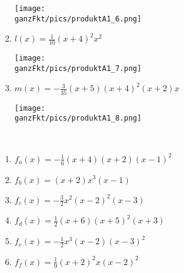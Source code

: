 \begin{Answer}[ref=ganzProduktA1]
\begin{minipage}{\textwidth}
\begin{minipage}{0.49\textwidth}
\begin{enumerate}[label=\alph*)]
\begin{minipage}[t]{0.95\textwidth}
					\texttt{[image: \\ganzFkt/pics/produktA1\_6.png]}
				\end{minipage}
				\item \(l(x)=\frac{1}{10}\left( x+4\right) ^2 x^2\)\\\begin{minipage}[t]{0.95\textwidth}
					\texttt{[image: \\ganzFkt/pics/produktA1\_7.png]}
				\end{minipage}
				\item \(m(x)=-\frac{3}{35}\left( x+5\right) \left( x+4\right) ^2\left( x+2\right) x\)\\\begin{minipage}[t]{0.95\textwidth}
					\texttt{[image: \\ganzFkt/pics/produktA1\_8.png]}
				\end{minipage}
			\end{enumerate}
		\end{minipage}
	\end{minipage}
\end{Answer}\newpage
\begin{Answer}[ref=ganzProduktA2]\\
	\begin{minipage}{\textwidth}
		\begin{minipage}[t]{0.49\textwidth}
			\begin{enumerate}[label=\alph*)]
				\item \(f_a(x)=-\frac{1}{6}\left(x+4\right) \left(x+2\right) \left(x-1\right)^2 \)
				\item \(f_b(x)=\left(x+2\right)x^3\left(x-1\right) \)
				\item \(f_c(x)=-\frac{3}{2}x^2\left(x-2\right)^2 \left(x-3\right) \)
			\end{enumerate}
		\end{minipage}
		\begin{minipage}[t]{0.49\textwidth}
			\begin{enumerate}[label=\alph*)]
				\setcounter{enumi}{3}
				\item \(f_d(x)=\frac{1}{2}\left(x+6\right) \left(x+5\right)^2 \left(x+3\right) \)
				\item \(f_e(x)=-\frac{1}{2}x^3\left(x-2\right) \left(x-3\right)^2 \)
				\item \(f_f(x)=\frac{1}{9}\left(x+2\right)^2 x\left(x-2\right)^2 \)
			\end{enumerate}
		\end{minipage}
	\end{minipage}
\end{Answer}